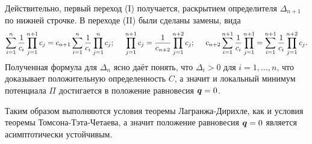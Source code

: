 Действительно, первый переход (I) получается, раскрытием определителя $\Delta_{n+1}$ по нижней строчке. В переходе (II) были сделаны замены, вида
\begin{equation*}
        \sum_{i=1}^{n} \frac{1}{c_i}
            \prod_{j=1}^{n+1} c_j
        = 
        c_{n+1} \sum\limits_{i=1}^{n} \frac{1}{c_i}
            \prod\limits_{j=1}^{n} c_j
        ; \hspace{0.5 cm}
        \prod_{j=1}^{n+1} c_j = 
        \frac{1}{c_{n+2}} \prod_{j=1}^{n+2} c_j
        ; \hspace{0.5 cm}
        c_{n+2} \sum_{i=1}^{n+1} \frac{1}{c_i} \prod_{j=1}^{n+1}
        =
        \sum_{i=1}^{n+1} \frac{1}{c_i} \prod_{j=1}^{n+2} c_j.        
\end{equation*}
Полученная формула для $\Delta_n$ ясно даёт понять, что $\Delta_i > 0$ для $i = 1, \ldots, n$, что доказывает положительную определенность $C$, а значит и локальный минимум потенциала $\Pi$ достигается в положение равновесия $\mbox{\boldmath $q$}=0$. 

Таким образом выполняются условия теоремы Лагранжа-Дирихле, как и условия теоремы Томсона-Тэта-Четаева, а значит положение равновесия $\mbox{\boldmath $q$}=0$ является асимптотически устойчивым.
